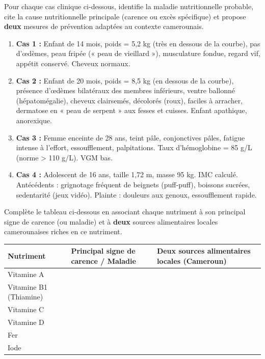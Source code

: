 \documentclass[11pt]{article}
\begin{document}
\begin{exercice}
Pour chaque cas clinique ci-dessous, identifie la maladie nutritionnelle probable, cite la cause nutritionnelle principale (carence ou excès spécifique) et propose \textbf{deux} mesures de prévention adaptées au contexte camerounais.
\begin{enumerate}
    \item \textbf{Cas 1 :} Enfant de 14 mois, poids = 5,2 kg (très en dessous de la courbe), pas d'œdèmes, peau fripée (« peau de vieillard »), musculature fondue, regard vif, appétit conservé. Cheveux normaux.
    \item \textbf{Cas 2 :} Enfant de 20 mois, poids = 8,5 kg (en dessous de la courbe), présence d'œdèmes bilatéraux des membres inférieurs, ventre ballonné (hépatomégalie), cheveux clairsemés, décolorés (roux), faciles à arracher, dermatose en « peau de serpent » aux fesses et cuisses. Enfant apathique, anorexique.
    \item \textbf{Cas 3 :} Femme enceinte de 28 ans, teint pâle, conjonctives pâles, fatigue intense à l'effort, essoufflement, palpitations. Taux d'hémoglobine = 85 g/L (norme > 110 g/L). VGM bas.
    \item \textbf{Cas 4 :} Adolescent de 16 ans, taille 1,72 m, masse 95 kg. IMC calculé. Antécédents : grignotage fréquent de beignets (puff-puff), boissons sucrées, sedentarité (jeux vidéo). Plainte : douleurs aux genoux, essoufflement rapide.
\end{enumerate}
\end{exercice}

\begin{exercice}
Complète le tableau ci-dessous en associant chaque nutriment à son principal signe de carence (ou maladie) et à \textbf{deux} sources alimentaires locales camerounaises riches en ce nutriment.
\begin{center}
\begin{tabularx}{\linewidth}{|l|X|X|}\hline
\textbf{Nutriment} & \textbf{Principal signe de carence / Maladie} & \textbf{Deux sources alimentaires locales (Cameroun)} \\ \hline
Vitamine A & & \\ \hline
Vitamine B1 (Thiamine) & & \\ \hline
Vitamine C & & \\ \hline
Vitamine D & & \\ \hline
Fer & & \\ \hline
Iode & & \\ \hline
\end{tabularx}
\end{center}
\end{exercice}
\end{document}
